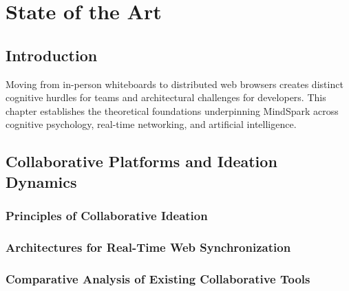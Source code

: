 
\chapter{State of the Art}
\label{chap:state_of_the_art}


\section{Introduction}
\label{sec:ch2_intro}
Moving from in-person whiteboards to distributed web browsers creates distinct cognitive hurdles for teams and architectural challenges for developers. This chapter establishes the theoretical foundations underpinning MindSpark across cognitive psychology, real-time networking, and artificial intelligence.

\section{Collaborative Platforms and Ideation Dynamics}
\label{sec:ch2_collab_platforms}
\subsection{Principles of Collaborative Ideation}
\label{subsec:ch2_ideation_principles}

\subsection{Architectures for Real-Time Web Synchronization}
\label{subsec:ch2_sync_architectures}

\subsection{Comparative Analysis of Existing Collaborative Tools}
\label{subsec:ch2_tool_comparison}

